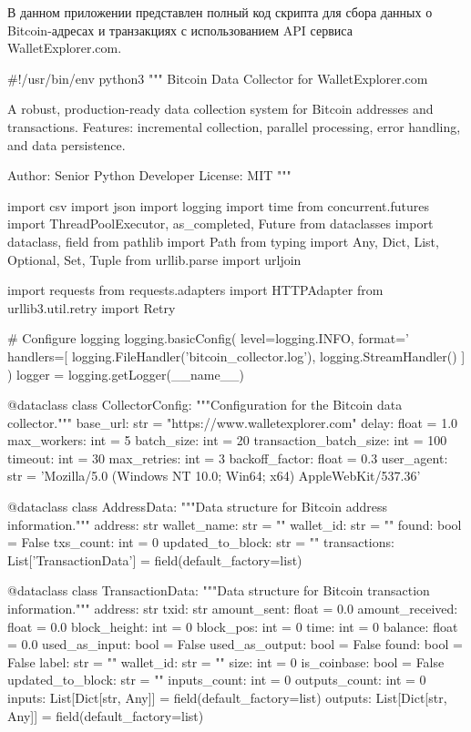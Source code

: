 
В данном приложении представлен полный код скрипта для сбора данных о Bitcoin-адресах и транзакциях с использованием API сервиса WalletExplorer.com.

\begin{codelisting}[language=Python, caption=Основной скрипт сбора данных]
#!/usr/bin/env python3
"""
Bitcoin Data Collector for WalletExplorer.com

A robust, production-ready data collection system for Bitcoin addresses and transactions.
Features: incremental collection, parallel processing, error handling, and data persistence.

Author: Senior Python Developer
License: MIT
"""

import csv
import json
import logging
import time
from concurrent.futures import ThreadPoolExecutor, as_completed, Future
from dataclasses import dataclass, field
from pathlib import Path
from typing import Any, Dict, List, Optional, Set, Tuple
from urllib.parse import urljoin

import requests
from requests.adapters import HTTPAdapter
from urllib3.util.retry import Retry


# Configure logging
logging.basicConfig(
    level=logging.INFO,
    format='%
    handlers=[
        logging.FileHandler('bitcoin_collector.log'),
        logging.StreamHandler()
    ]
)
logger = logging.getLogger(__name__)


@dataclass
class CollectorConfig:
    """Configuration for the Bitcoin data collector."""
    base_url: str = "https://www.walletexplorer.com"
    delay: float = 1.0
    max_workers: int = 5
    batch_size: int = 20
    transaction_batch_size: int = 100
    timeout: int = 30
    max_retries: int = 3
    backoff_factor: float = 0.3
    user_agent: str = 'Mozilla/5.0 (Windows NT 10.0; Win64; x64) AppleWebKit/537.36'


@dataclass
class AddressData:
    """Data structure for Bitcoin address information."""
    address: str
    wallet_name: str = ""
    wallet_id: str = ""
    found: bool = False
    txs_count: int = 0
    updated_to_block: str = ""
    transactions: List['TransactionData'] = field(default_factory=list)


@dataclass
class TransactionData:
    """Data structure for Bitcoin transaction information."""
    address: str
    txid: str
    amount_sent: float = 0.0
    amount_received: float = 0.0
    block_height: int = 0
    block_pos: int = 0
    time: int = 0
    balance: float = 0.0
    used_as_input: bool = False
    used_as_output: bool = False
    found: bool = False
    label: str = ""
    wallet_id: str = ""
    size: int = 0
    is_coinbase: bool = False
    updated_to_block: str = ""
    inputs_count: int = 0
    outputs_count: int = 0
    inputs: List[Dict[str, Any]] = field(default_factory=list)
    outputs: List[Dict[str, Any]] = field(default_factory=list)



\end{codelisting}
